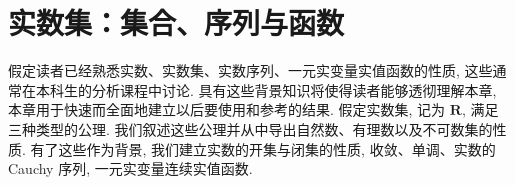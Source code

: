 \documentclass[../main.tex]{subfiles}
\begin{document}
\chapter{实数集：集合、序列与函数}\label{chapter:ch01-实数集}

假定读者已经熟悉实数、实数集、实数序列、一元实变量实值函数的性质, 这些通常在本科生的分析课程中讨论. 具有这些背景知识将使得读者能够透彻理解本章, 本章用于快速而全面地建立以后要使用和参考的结果. 假定实数集, 记为 $\mathbf{R}$, 满足三种类型的公理. 我们叙述这些公理并从中导出自然数、有理数以及不可数集的性质. 有了这些作为背景, 我们建立实数的开集与闭集的性质, 收敛、单调、实数的 Cauchy 序列, 一元实变量连续实值函数.












\end{document}
